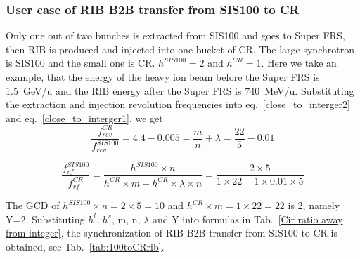 \subsubsection{User case of RIB B2B transfer from SIS100 to CR} 
Only one out of two bunches is extracted from SIS100 and goes to Super FRS, then RIB is produced and injected into one bucket of CR. The large synchrotron is SIS100 and the small one is CR. $h^{SIS100}=2$ and $h^{CR}=1$. Here we take an example, that the energy of the heavy ion beam before the Super FRS is \SI{1.5}{GeV/\atomicmassunit} and the RIB energy after the Super FRS is \SI{740}{MeV/\atomicmassunit}. Substituting the extraction and injection revolution frequencies into eq.~\ref{close_to_interger2} and eq.~\ref{close_to_interger1}, we get
\begin{equation} 
\frac{f_{rev}^{CR}}{f_{rev}^{SIS100}}=4.4-0.005=\frac{m}{n}+ \lambda=\frac{22}{5}-0.01
\end{equation}

\begin{equation} 
\frac{f_{rf}^{SIS100}}{f_{rf}^{CR}}=\frac{h^{SIS100}\times n}{h^{CR} \times m+ h^{CR} \times\lambda\times n}=\frac{2\times 5}{1 \times 22- 1 \times0.01\times 5}
\end{equation}

The GCD of $h^{SIS100}\times n=2\times5=10$ and $h^{CR} \times m=1\times 22=22$ is 2, namely Y=2. Substituting $h^l$, $h^s$, m, n, $\lambda$ and Y into formulas in Tab.~\ref{Cir ratio away from integer}, the synchronization of RIB B2B transfer from SIS100 to CR is obtained, see Tab.~\ref{tab:100toCRrib}.

